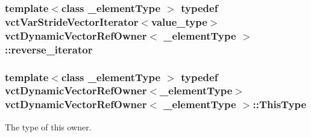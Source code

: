 \hypertarget{classvct_dynamic_vector_ref_owner_a3949acd3baa131459d464b058d249990}{
\subsubsection[{reverse\-\_\-iterator}]{\setlength{\rightskip}{0pt plus 5cm}template$<$class \-\_\-element\-Type $>$ typedef {\bf vct\-Var\-Stride\-Vector\-Iterator}$<$value\-\_\-type$>$ {\bf vct\-Dynamic\-Vector\-Ref\-Owner}$<$ \-\_\-element\-Type $>$\-::{\bf reverse\-\_\-iterator}}}\label{classvct_dynamic_vector_ref_owner_a3949acd3baa131459d464b058d249990}
\hypertarget{classvct_dynamic_vector_ref_owner_a9f1aa02eeb60e1b554086aad69baa458}{
\subsubsection[{This\-Type}]{\setlength{\rightskip}{0pt plus 5cm}template$<$class \-\_\-element\-Type $>$ typedef {\bf vct\-Dynamic\-Vector\-Ref\-Owner}$<$\-\_\-element\-Type$>$ {\bf vct\-Dynamic\-Vector\-Ref\-Owner}$<$ \-\_\-element\-Type $>$\-::{\bf This\-Type}}}\label{classvct_dynamic_vector_ref_owner_a9f1aa02eeb60e1b554086aad69baa458}
The type of this owner. 

